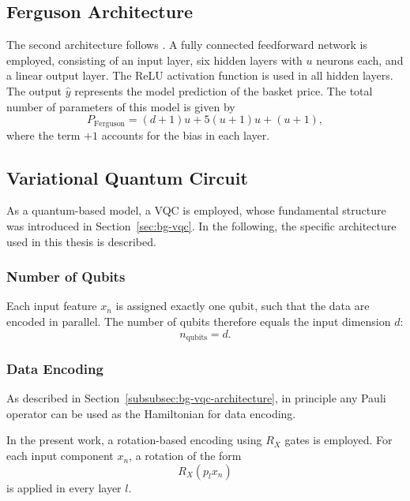 \subsection{Ferguson Architecture}
\label{sec:mt-ferguson}

The second architecture follows \cite{ferguson2018deeply}.
A fully connected feedforward network is employed, consisting of an input layer, six hidden layers with $u$ neurons each, and a linear output layer. The ReLU activation function is used in all hidden layers.
The output $\hat{y}$ represents the model prediction of the basket price.
The total number of parameters of this model is given by
\begin{equation}
\label{eq:params_ferguson}
P_{\text{Ferguson}}
=
(d+1)u
+ 5(u+1)u
+ (u+1),
\end{equation}
where the term $+1$ accounts for the bias in each layer.

\subsection{Variational Quantum Circuit}
\label{sec:mt-vqc-model}

As a quantum-based model, a VQC is employed, whose fundamental structure was introduced in Section~\ref{sec:bg-vqc}.
In the following, the specific architecture used in this thesis is described.

\subsubsection{Number of Qubits}

Each input feature $x_n$ is assigned exactly one qubit, such that the data are encoded in parallel. The number of qubits therefore equals the input dimension $d$:
\begin{equation}
n_{\text{qubits}} = d.
\end{equation}

\subsubsection{Data Encoding}

As described in Section~\ref{subsubsec:bg-vqc-architecture},
in principle any Pauli operator can be used as the Hamiltonian for data encoding.

In the present work, a rotation-based encoding using $R_X$ gates is employed. For each input component $x_n$, a rotation of the form
\[
R_X(p_l x_n)
\]
is applied in every layer $l$.

